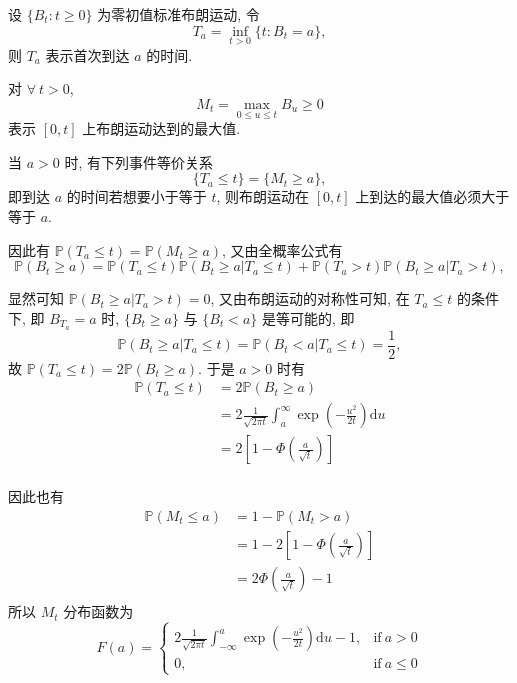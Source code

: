 \documentclass[openany]{ctexbook}
\theoremstyle{kaiti}
\theoremstyle{normal}
\begin{document}
设 $\{B_t:t\geqslant0\}$ 为零初值标准布朗运动, 令
\begin{equation}
  T_a=\inf_{t>0}\{t:B_t=a\},
\end{equation}
则 $T_a$ 表示首次到达 $a$ 的时间.

对 $\forall~t>0$,
\begin{equation}
  M_t=\max_{0\leqslant u\leqslant t}B_u\geqslant0
\end{equation}
表示 $[0,t]$ 上布朗运动达到的最大值.

当 $a>0$ 时, 有下列事件等价关系
\begin{equation}
  \{T_a\leqslant t\}=\{M_t\geqslant a\},
\end{equation}
即到达 $a$ 的时间若想要小于等于 $t$, 则布朗运动在 $[0,t]$ 上到达的最大值必须大于等于 $a$.

因此有 $\mathbb{P}(T_a\leqslant t)=\mathbb{P}(M_t\geqslant a)$, 又由全概率公式有
\begin{equation}
  \mathbb{P}(B_t\geqslant a)=\mathbb{P}(T_a\leqslant t)\mathbb{P}(B_t\geqslant a|T_a\leqslant t)+\mathbb{P}(T_a>t)\mathbb{P}(B_t\geqslant a|T_a>t),
\end{equation}

显然可知 $\mathbb{P}(B_t\geqslant a|T_a>t)=0$, 又由布朗运动的对称性可知, 在 $T_a\leqslant t$ 的条件下, 即 $B_{T_a}=a$ 时, $\{B_t\geqslant a\}$ 与 $\{B_t<a\}$ 是等可能的, 即
\begin{equation}
  \mathbb{P}(B_t\geqslant a|T_a\leqslant t)=\mathbb{P}(B_t<a|T_a\leqslant t)=\frac{1}{2},
\end{equation}
故 $\mathbb{P}(T_a\leqslant t)=2\mathbb{P}(B_t\geqslant a)$. 于是 $a>0$ 时有
\begin{equation}
  \begin{aligned}
    \mathbb{P}(T_a\leqslant t)
    &=2\mathbb{P}(B_t\geqslant a)\\
    &=2\frac{1}{\sqrt{2\pi t}}\int_a^\infty\exp\left(-\frac{u^2}{2t}\right)\mathrm{d}u\\
    &=2\left[1-\Phi\left(\frac{a}{\sqrt{t}}\right)\right]\\
  \end{aligned}
\end{equation}

因此也有
\begin{equation}
  \begin{aligned}
    \mathbb{P}(M_t\leqslant a)
    &=1-\mathbb{P}(M_t>a)\\
    &=1-2\left[1-\Phi\left(\frac{a}{\sqrt{t}}\right)\right]\\
    &=2\Phi\left(\frac{a}{\sqrt{t}}\right)-1\\
  \end{aligned}
\end{equation}
所以 $M_t$ 分布函数为
\begin{equation}
  F(a)=
  \begin{cases}
    \displaystyle2\frac{1}{\sqrt{2\pi t}}\int_{-\infty}^a\exp\left(-\frac{u^2}{2t}\right)\mathrm{d}u-1,&\text{if}~a>0\\
    0,&\text{if}~a\leqslant0
  \end{cases}
\end{equation}
\end{document}
